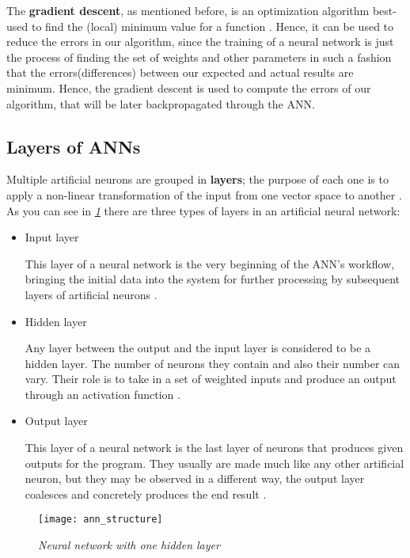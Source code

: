 The \textbf{gradient descent}, as mentioned before,
is an optimization algorithm best-used to find the (local) minimum value for a function \cite{brownlee2016master}.
Hence, it can be used to reduce the errors in our algorithm,
since the training of a neural network is just the process of finding the set of weights and other
parameters in such a fashion that the errors(differences) between our expected and actual results are minimum.
Hence, the gradient descent is used to compute the errors of our algorithm, that will be later backpropagated
through the ANN.


\subsection{Layers of ANNs}
Multiple artificial neurons are grouped in \textbf{layers};
the purpose of each one is to apply a non-linear
transformation of the input from one vector space to another \cite{appliedDeepLearning}.
As you can see in \emph{\ref{fig:ann_structure}} there are three types of layers in an artificial neural network:
\begin{itemize}[]
    \item{ Input layer
          \begin{adjustwidth}{1cm}{}
              This layer of a neural network is the very beginning of the ANN’s workflow, bringing the initial data into the system for
              further processing by subsequent layers of artificial neurons \cite{inputLayer}.
          \end{adjustwidth}
          }
    \item{ Hidden layer
          \begin{adjustwidth}{1cm}{}
              Any layer between the output and the input layer is considered to be a hidden layer.
              The number of neurons they contain and also their number can vary.
              Their role is to take in a set of weighted inputs and produce an output through an activation function \cite{hiddenlayer}.
          \end{adjustwidth}
          }
    \item{ Output layer
          \begin{adjustwidth}{1cm}{}
              This layer of a neural network is the last layer of neurons that produces given outputs for the program.
              They usually are made much like any other artificial neuron, but they may be observed in a different way,
              the output layer coalesces and concretely produces the end result \cite{outputLayer}.
          \end{adjustwidth}
          }
\end{itemize}
\begin{figure}[h]
    \centering
    \texttt{[image: ann\_structure]}
    \caption{\emph{Neural network with one hidden layer \cite{understandingANN}}}
    \label{fig:ann_structure}
\end{figure}


